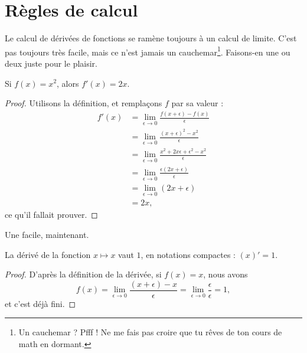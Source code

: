					\section{Règles de calcul}

Le calcul de dérivées de fonctions se ramène toujours à un calcul de limite. C'est pas toujours très facile, mais ce n'est jamais un cauchemar\footnote{Un cauchemar ? Pfff ! Ne me fais pas croire que tu rêves de ton cours de math en dormant.}. Faisons-en une ou deux juste pour le plaisir.

\begin{lemma}			\label{LemDeccCarr}
	Si $f(x)=x^2$, alors $f'(x)=2x$.
\end{lemma}

\begin{proof}
	Utilisons la définition, et remplaçons $f$ par sa valeur :
	\begin{subequations}
		\begin{align}
			f'(x)	&=\lim_{\epsilon\to 0}\frac{ f(x+\epsilon)-f(x) }{ \epsilon }\\
				&=\lim_{\epsilon\to 0}\frac{ (x+\epsilon)^2-x^2 }{ \epsilon }\\
				&=\lim_{\epsilon\to 0}\frac{ x^2+2x\epsilon+\epsilon^2-x^2 }{ \epsilon }\\
				&=\lim_{\epsilon\to 0}\frac{\epsilon(2x+\epsilon)}{ \epsilon }\\
				&=\lim_{\epsilon\to 0}(2x+\epsilon)\\
				&=2x,
		\end{align}
	\end{subequations}
	ce qu'il fallait prouver.
\end{proof}

Une facile, maintenant.
\begin{proposition}
	La dérivé de la fonction $x\mapsto x$ vaut $1$, en notations compactes : $(x)'=1$.
\end{proposition}

\begin{proof}
D'après la définition de la dérivée, si $f(x)=x$, nous avons
\begin{equation}
	f(x)=\lim_{\epsilon\to 0}\frac{ (x+\epsilon) -x }{\epsilon} =\lim_{\epsilon\to 0}\frac{ \epsilon }{\epsilon} =1,
\end{equation}
et c'est déjà fini.
\end{proof}


